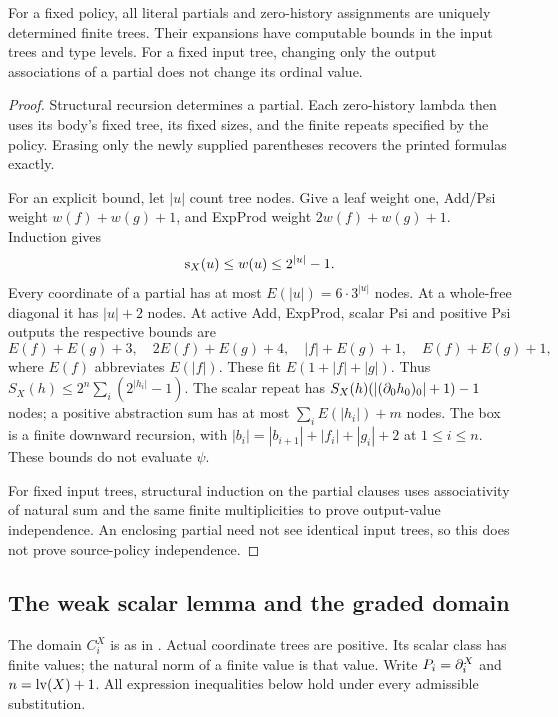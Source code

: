 \begin{proposition}\label{wwsc:prop:finite}
For a fixed policy, all literal partials and zero-history assignments
are uniquely determined finite trees. Their expansions have computable
bounds in the input trees and type levels. For a fixed input tree,
changing only the output associations of a partial does not change
its ordinal value.
\end{proposition}
\begin{proof}
Structural recursion determines a partial. Each zero-history lambda
then uses its body's fixed tree, its fixed sizes, and the finite
repeats specified by the policy. Erasing only the newly supplied
parentheses recovers the printed formulas exactly.

For an explicit bound, let $|u|$ count tree nodes. Give a leaf weight
one, Add/Psi weight $w(f)+w(g)+1$, and ExpProd weight
$2w(f)+w(g)+1$. Induction gives
\[
 \operatorname{s}_X(u)\le w(u)\le2^{|u|}-1.
\]
Every coordinate of a partial has at most $E(|u|)=6\cdot3^{|u|}$ nodes.
At a whole-free diagonal it has $|u|+2$ nodes. At active Add, ExpProd,
scalar Psi and positive Psi outputs the respective bounds are
\[
 E(f)+E(g)+3,\quad 2E(f)+E(g)+4,\quad
 |f|+E(g)+1,\quad E(f)+E(g)+1,
\]
where $E(f)$ abbreviates $E(|f|)$. These fit $E(1+|f|+|g|)$.
Thus $S_X(h)\le2^n\sum_i(2^{|h_i|}-1)$. The scalar repeat has
$S_X(h)(|(\partial_0h_0)_0|+1)-1$ nodes; a positive abstraction sum has
at most $\sum_i E(|h_i|)+m$ nodes. The box is a finite downward
recursion, with $|b_i|=|b_{i+1}|+|f_i|+|g_i|+2$ at $1\le i\le n$.
These bounds do not evaluate $\psi$.

For fixed input trees, structural induction on the partial clauses
uses associativity of natural sum and the same finite multiplicities
to prove output-value independence. An enclosing partial need not see
identical input trees, so this does not prove source-policy independence.
\end{proof}

\subsection{The weak scalar lemma and the graded domain}

The domain $C_i^X$ is as in \cite[Definition~2.9]{ww}. Actual coordinate
trees are positive. Its scalar class has finite values; the natural norm
of a finite value is that value. Write $P_i=\partial_i^X$ and $n=\operatorname{lv}(X)+1$.
All expression inequalities below hold under every admissible substitution.

